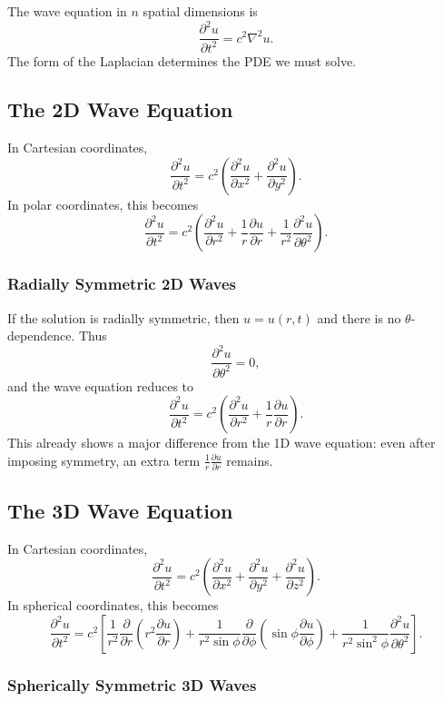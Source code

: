 \documentclass{report}
\numberwithin{equation}{section}
\begin{document}
The wave equation in \(n\) spatial dimensions is
\[
\frac{\partial^2 u}{\partial t^2} = c^2 \nabla^2 u.
\]
The form of the Laplacian determines the PDE we must solve.

\subsection{The 2D Wave Equation}

In Cartesian coordinates,
\[
\frac{\partial^2 u}{\partial t^2}
=
c^2
\left(
\frac{\partial^2 u}{\partial x^2}
+
\frac{\partial^2 u}{\partial y^2}
\right).
\]
In polar coordinates, this becomes
\[
\frac{\partial^2 u}{\partial t^2}
=
c^2
\left(
\frac{\partial^2 u}{\partial r^2}
+
\frac{1}{r}\frac{\partial u}{\partial r}
+
\frac{1}{r^2}\frac{\partial^2 u}{\partial \theta^2}
\right).
\]

\subsubsection*{Radially Symmetric 2D Waves}

If the solution is radially symmetric, then \(u=u(r,t)\) and there is no \(\theta\)-dependence. Thus
\[
\frac{\partial^2 u}{\partial \theta^2}=0,
\]
and the wave equation reduces to
\[
\frac{\partial^2 u}{\partial t^2}
=
c^2
\left(
\frac{\partial^2 u}{\partial r^2}
+
\frac{1}{r}\frac{\partial u}{\partial r}
\right).
\]
This already shows a major difference from the 1D wave equation: even after imposing symmetry, an extra term \( \frac{1}{r}\frac{\partial u}{\partial r} \) remains.

\subsection{The 3D Wave Equation}

In Cartesian coordinates,
\[
\frac{\partial^2 u}{\partial t^2}
=
c^2
\left(
\frac{\partial^2 u}{\partial x^2}
+
\frac{\partial^2 u}{\partial y^2}
+
\frac{\partial^2 u}{\partial z^2}
\right).
\]
In spherical coordinates, this becomes
\[
\frac{\partial^2 u}{\partial t^2}
=
c^2
\left[
\frac{1}{r^2}\frac{\partial}{\partial r}\left(r^2\frac{\partial u}{\partial r}\right)
+
\frac{1}{r^2\sin\phi}\frac{\partial}{\partial \phi}\left(\sin\phi\frac{\partial u}{\partial \phi}\right)
+
\frac{1}{r^2\sin^2\phi}\frac{\partial^2 u}{\partial \theta^2}
\right].
\]

\subsubsection*{Spherically Symmetric 3D Waves}
\end{document}
